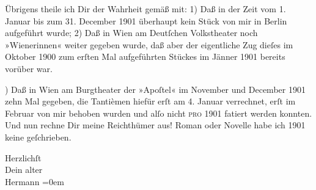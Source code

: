 \pstart
           Übrigens theile ich Dir der Wahrheit gemäß mit: 1) Daß in der Zeit vom 1. Januar bis
               zum 31. December 1901 überhaupt kein Stück von mir in Berlin aufgeführt wurde; {\pb}2) Daß in Wien am Deutſchen
                  Volkstheater noch »Wienerinnen« weiter
               gegeben wurde, daß aber der eigentliche Zug dieſes im Oktober 1900 zum erſten Mal
               aufgeführten Stückes im Jänner 1901 bereits vorüber war.\pend
           
) Daß in Wien am Burgtheater der »Apoſtel« im November
               und December 1901 zehn Mal gegeben, die {\pb}Tantièmen
               hiefür erſt am 4. Januar verrechnet, erſt im Februar von mir behoben wurden und alſo
               nicht \textsc{pro} 1901 fatiert werden konnten. Und nun rechne Dir
               meine Reichthümer aus! Roman oder Novelle habe ich 1901 keine geſchrieben.\pend
           
\pstart
           Herzlichſt{\\[\baselineskip]}Dein alter{\\[\baselineskip]}\spacefill\mbox{Hermann}\pend
           \leftskip=0em{}\endnumbering{}  \newcommand{\dateiname}{L01230}\newcommand{\titel}{Hermann Bahr an Arthur Schnitzler, 10. 7. [1902]}\newcommand{\editorInnen}{Herausgegeben von Martin Anton Müller}
